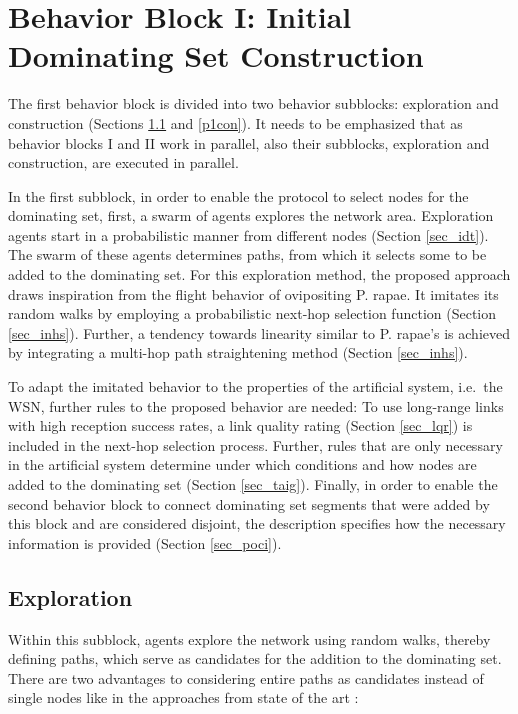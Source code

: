 \section{Behavior Block I: Initial Dominating Set Construction}\label{sb1}\label{bbii}


The first behavior block is divided into two behavior subblocks: exploration and construction (Sections \ref{p1ex} and \ref{p1con}). It needs to be emphasized that as behavior blocks I and II work in parallel, also their subblocks, exploration and construction, are executed in parallel.

In the first subblock, in order to enable the protocol to select nodes for the dominating set, first, a swarm of agents explores the network area. Exploration agents start in a probabilistic manner from different nodes (Section \ref{sec_idt}). The swarm of these agents determines paths, from which it selects some to be added to the dominating set. For this exploration method, the proposed approach draws inspiration from the flight behavior of ovipositing P. rapae. It imitates its random walks by employing a probabilistic next-hop selection function (Section \ref{sec_inhs}). Further, a tendency towards linearity similar to P. rapae's is achieved by integrating a multi-hop path straightening method (Section \ref{sec_inhs}). 

To adapt the imitated behavior to the properties of the artificial system, i.e.\ the WSN, further rules to the proposed behavior are needed: To use long-range links with high reception success rates, a link quality rating (Section \ref{sec_lqr}) is included in the next-hop selection process. Further, rules that are only necessary in the artificial system determine under which conditions and how nodes are added to the dominating set (Section \ref{sec_taig}). Finally, in order to enable the second behavior block to connect dominating set segments that were added by this block and are considered disjoint, the description specifies how the necessary information is provided (Section \ref{sec_poci}).



\subsection{Exploration}\label{p1ex}

Within this subblock, agents explore the network using random walks, thereby defining paths, which serve as candidates for the addition to the dominating set. There are two advantages to considering entire paths as candidates instead of single nodes like in the approaches from state of the art \cite{sausenSLP07backbones, theoleyreV04structure, yangLT08algorithm, yangWC05clustering}:

